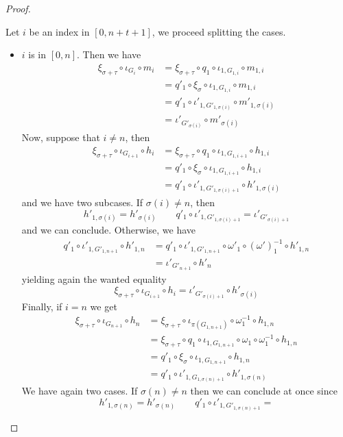 \documentclass[a4paper,UKenglish,cleveref,pdftex, thm-restate,numberwithinsect]{lipics}
\begin{document}
\begin{proof}
\begin{itemize}
Let $i$ be an index in $[0, n+t+1]$, we proceed splitting the cases.
\begin{itemize}
	\item $i$ is in $[0,n]$. Then we have
	\begin{align*}
		\xi_{\sigma+\tau}\circ \iota_{G_i} \circ m_i &= \xi_{\sigma+\tau} \circ q_1\circ \iota_{1, G_{1,i}}\circ m_{1,i}\\&=q'_1 \circ \xi_\sigma \circ \iota_{1, G_{1,i}}\circ m_{1,i}\\&= q'_1\circ \iota'_{1, G'_{1,\sigma(i)}}\circ m'_{1,\sigma(i)}\\&=\iota'_{G'_{\sigma(i)}}\circ m'_{\sigma(i)}
	\end{align*}
	Now, suppose that $i\neq n$, then 
	\begin{align*}
		\xi_{\sigma+\tau}\circ \iota_{G_{i+1}} \circ h_i &= \xi_{\sigma+\tau} \circ q_1\circ \iota_{1, G_{1,{i+1}}}\circ h_{1,i}\\&=q'_1\circ \xi_\sigma \circ \iota_{1, G_{1,{i+1}}}\circ h_{1,i}\\&= q'_1\circ \iota'_{1, G'_{1,\sigma(i)+1}}\circ h'_{1,\sigma(i)}
	\end{align*}
	and we have two subcases. If $\sigma(i)\neq n$, then \[h'_{1, \sigma(i)}=h'_{\sigma(i)} \qquad q'_1\circ \iota'_{1, G'_{1,\sigma(i)+1}}=
	\iota'_{G'_{\sigma(i)+1}}\] 
	and we can conclude. Otherwise, we have
	\begin{align*}q'_1\circ \iota'_{1, G'_{1,n+1}}\circ h'_{1,n}&=q'_1 \circ \iota'_{1,G'_{1,n+1}} \circ \omega'_1\circ (\omega')^{-1}_1 \circ h'_{1,n}\\&=\iota'_{G'_{n+1}}\circ h'_n
	\end{align*}
	yielding again the wanted equality
	\[\xi_{\sigma+\tau}\circ \iota_{G_{i+1}} \circ h_i=\iota'_{G'_{\sigma(i)+1}}\circ h'_{\sigma(i)}\]
	Finally, if $i=n$ we get
	\begin{align*}
		\xi_{\sigma+\tau}\circ \iota_{G_{n+1}} \circ h_n &= \xi_{\sigma+\tau} \circ \iota_{\pi(G_{1,n+1})} \circ \omega^{-1}_1\circ h_{1,n}\\&= \xi_{\sigma+\tau} \circ q_1\circ \iota_{1, G_{1,n+1}} \circ \omega_1 \circ \omega^{-1}_1 \circ h_{1,n}\\&=q'_1 \circ \xi_\sigma \circ \iota_{1, G_{1,n+1}} \circ h_{1,n}\\&=q'_1\circ \iota'_{1, G_{1,\sigma(n)+1}} \circ h'_{1,\sigma(n)}
	\end{align*}
	We have again two cases. If $\sigma(n)\neq n$ then we can conclude at once since 
	\[h'_{1, \sigma(n)}=h'_{\sigma(n)} \qquad q'_1\circ \iota'_{1, G'_{1,\sigma(n)+1}}=
\]
\end{itemize}
\end{itemize}
\end{proof}
\end{document}
